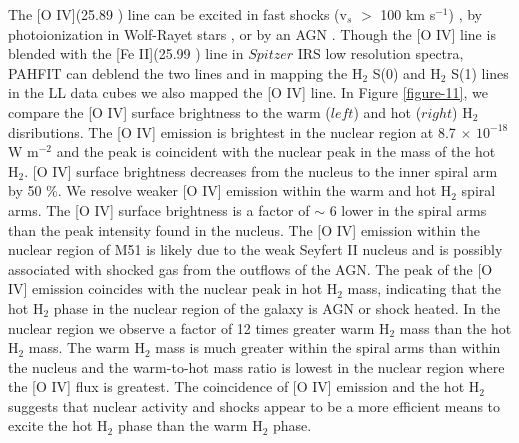 \documentclass[manuscript]{aastex}
\begin{document}
The [O IV](25.89 \micron) line can be excited in fast shocks 
(v$_s$ $>$ 100 km s$^{-1}$) \citep{lutz98},
by photoionization in Wolf-Rayet stars \citep{ss99}, or by an
AGN \citep{smi04}.  Though the [O IV] line is
blended with the [Fe II](25.99 \micron) line in $Spitzer$ IRS low
resolution spectra, PAHFIT can deblend the two lines and in mapping
the $\mathrm{H_2}$ S(0) and $\mathrm{H_2}$ S(1) lines in the LL data
cubes we also mapped the [O IV] line.  In Figure \ref{figure-11}, we compare 
the [O IV] surface brightness to the warm ($left$) and hot ($right$) $\mathrm{H_2}$ disributions.  
The [O IV] emission is brightest in the nuclear region at 8.7 $\times$
$\mathrm{10^{-18}}$ W $\mathrm{m^{-2}}$ and the peak is coincident with
the nuclear peak in the mass of the hot $\mathrm{H_2}$.  [O IV]
surface brightness decreases from the nucleus to the inner spiral arm by 50 \%.
We resolve weaker [O IV] emission within the warm and hot
$\mathrm{H_2}$ spiral arms.  The [O IV] surface brightness
is a factor of $\sim$ 6 lower in the spiral arms than the peak
intensity found in the nucleus.  The [O IV] emission within the nuclear 
region of M51 is likely due to the weak Seyfert II nucleus \citep{ford85} 
and is possibly associated with shocked gas from the outflows of the AGN.  
The peak of the [O IV] emission coincides with the nuclear peak in hot 
$\mathrm{H_2}$ mass, indicating that the hot $\mathrm{H_2}$ phase in the 
nuclear region of the galaxy is AGN or shock heated. 
In the nuclear region we observe a factor of 12 times greater
warm $\mathrm{H_2}$ mass than the hot H$_2$ mass.  
The warm $\mathrm{H_2}$ mass is much
greater within the spiral arms than within the nucleus and the
warm-to-hot mass ratio is lowest in the nuclear region where 
the [O IV] flux is greatest.  The coincidence of [O IV] emission 
and the hot H$_2$ suggests that nuclear activity and shocks 
appear to be a more efficient means to excite the hot $\mathrm{H_2}$ 
phase than the warm $\mathrm{H_2}$ phase.
\end{document}

